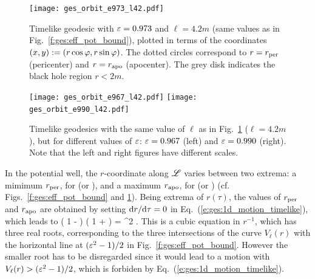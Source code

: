 \begin{figure}
\centerline{\texttt{[image: ges\_orbit\_e973\_l42.pdf]}}
\caption[]{\label{f:ges:orbit_e973_l42} \footnotesize
Timelike geodesic with $\varepsilon = 0.973$ and $\ell=4.2m$ (same values as in
Fig.~\ref{f:ges:eff_pot_bound}), plotted in terms of the coordinates
$(x,y) := (r\cos\varphi, r\sin\varphi)$. The dotted circles correspond to $r=r_{\rm per}$
(pericenter) and $r=r_{\rm apo}$ (apocenter). The grey disk indicates the
black hole region $r<2m$.
}
\end{figure}

\begin{figure}
\centerline{\texttt{[image: ges\_orbit\_e967\_l42.pdf]}\quad
\texttt{[image: ges\_orbit\_e990\_l42.pdf]}}
\caption[]{\label{f:ges:orbit_e967_990_l42} \footnotesize
Timelike geodesics with the same value of $\ell$ as in Fig.~\ref{f:ges:orbit_e973_l42} ($\ell=4.2m$), but for different values of $\varepsilon$: $\varepsilon = 0.967$ (left) and $\varepsilon=0.990$ (right).
Note that the left and right figures have different scales.
}
\end{figure}



In the potential well, the $r$-coordinate along $\mathscr{L}$ varies between two
extrema: a mimimum $r_{\rm per}$, for  (or
), and
a maximum
$r_{\rm apo}$, for  (or ) (cf. Figs.~\ref{f:ges:eff_pot_bound} and \ref{f:ges:orbit_e973_l42}). Being extrema of $r(\tau)$,
the values of $r_{\rm per}$ and $r_{\rm apo}$ are obtained by setting
$\mathrm{d} r /\mathrm{d}\tau =0$ in Eq.~(\ref{e:ges:1d_motion_timelike}), which leads to
\be
    \left( 1 -  \right) \left( 1 +  \right)
        = \veps^2 .
\ee
This is a cubic equation in $r^{-1}$, which has three real roots, corresponding
to the three intersections of the curve $V_{\ell}(r)$ with the horizontal
line at $(\varepsilon^2-1)/2$ in Fig.~\ref{f:ges:eff_pot_bound}. However the smaller
root has to be disregarded since it would lead to a motion with
$V_{\ell}(r) > (\varepsilon^2-1)/2$, which is forbiden by Eq.~(\ref{e:ges:1d_motion_timelike}).

